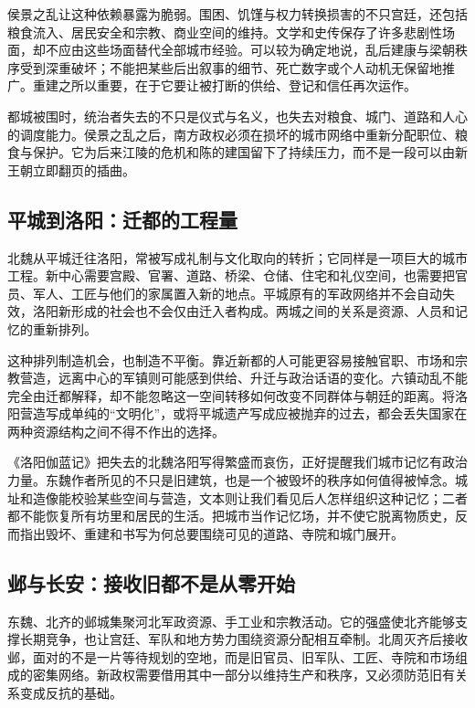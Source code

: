 侯景之乱让这种依赖暴露为脆弱。围困、饥馑与权力转换损害的不只宫廷，还包括粮食流入、居民安全和宗教、商业空间的维持。文学和史传保存了许多悲剧性场面，却不应由这些场面替代全部城市经验。可以较为确定地说，乱后建康与梁朝秩序受到深重破坏；不能把某些后出叙事的细节、死亡数字或个人动机无保留地推广。重建之所以重要，在于它要让被打断的供给、登记和信任再次运作。

\begin{turningpoint}
都城被围时，统治者失去的不只是仪式与名义，也失去对粮食、城门、道路和人心的调度能力。侯景之乱之后，南方政权必须在损坏的城市网络中重新分配职位、粮食与保护。它为后来江陵的危机和陈的建国留下了持续压力，而不是一段可以由新王朝立即翻页的插曲。
\end{turningpoint}

\subsection{平城到洛阳：迁都的工程量}

北魏从平城迁往洛阳，常被写成礼制与文化取向的转折；它同样是一项巨大的城市工程。新中心需要宫殿、官署、道路、桥梁、仓储、住宅和礼仪空间，也需要把官员、军人、工匠与他们的家属置入新的地点。平城原有的军政网络并不会自动失效，洛阳新形成的社会也不会仅由迁入者构成。两城之间的关系是资源、人员和记忆的重新排列。

这种排列制造机会，也制造不平衡。靠近新都的人可能更容易接触官职、市场和宗教营造，远离中心的军镇则可能感到供给、升迁与政治话语的变化。六镇动乱不能完全由迁都解释，却不能忽略这一空间转移如何改变不同群体与朝廷的距离。将洛阳营造写成单纯的“文明化”，或将平城遗产写成应被抛弃的过去，都会丢失国家在两种资源结构之间不得不作出的选择。

《洛阳伽蓝记》把失去的北魏洛阳写得繁盛而哀伤，正好提醒我们城市记忆有政治力量。东魏作者所见的不只是旧建筑，也是一个被毁坏的秩序如何值得被悼念。城址和造像能校验某些空间与营造，文本则让我们看见后人怎样组织这种记忆；二者都不能恢复所有坊里和居民的生活。把城市当作记忆场，并不使它脱离物质史，反而指出毁坏、重建和书写为何总要围绕可见的道路、寺院和城门展开。

\subsection{邺与长安：接收旧都不是从零开始}

东魏、北齐的邺城集聚河北军政资源、手工业和宗教活动。它的强盛使北齐能够支撑长期竞争，也让宫廷、军队和地方势力围绕资源分配相互牵制。北周灭齐后接收邺，面对的不是一片等待规划的空地，而是旧官员、旧军队、工匠、寺院和市场组成的密集网络。新政权需要借用其中一部分以维持生产和秩序，又必须防范旧有关系变成反抗的基础。

